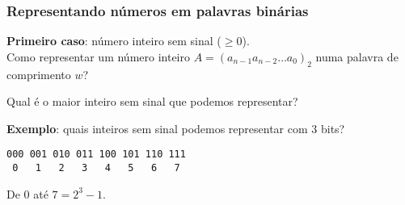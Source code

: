 \documentclass{beamer}
\begin{document}
\begin{frame}[fragile]
\frametitle{Representando números em palavras binárias}

\textbf{Primeiro caso}: número inteiro sem sinal ($\ge 0$).\\[12pt]

Como representar um número inteiro $A = (a_{n-1} a_{n-2} \ldots a_0)_2$ numa palavra de comprimento $w$?

%
%

\pause

Qual é o maior inteiro sem sinal que podemos representar?\\[12pt]

\pause

\textbf{Exemplo}: quais inteiros sem sinal podemos representar com $3$ bits?

\pause

\begin{Verbatim}[commandchars=\\\{\},codes={\catcode`$=3\catcode`^=7}]
000 001 010 011 100 101 110 111
 0   1   2   3   4   5   6   7
\end{Verbatim}

\pause

De $0$ até $7 = 2^3 - 1$.

\end{frame}
\end{document}
